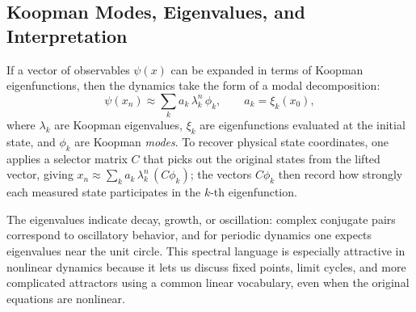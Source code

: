 \documentclass[11pt]{article}
\begin{document}
\subsection{Koopman Modes, Eigenvalues, and Interpretation}
If a vector of observables $\psi(x)$ can be expanded in terms of Koopman eigenfunctions, then the dynamics take the form of a modal decomposition:
\begin{equation}
    \psi(x_n) \approx \sum_{k} a_k \,\lambda_k^n \,\phi_k,
    \qquad a_k = \xi_k(x_0),
    \label{eq:modal-expansion}
\end{equation}
where $\lambda_k$ are Koopman eigenvalues, $\xi_k$ are eigenfunctions evaluated at the initial state, and $\phi_k$ are Koopman \emph{modes}. To recover physical state coordinates, one applies a selector matrix $C$ that picks out the original states from the lifted vector, giving $x_n \approx \sum_k a_k \,\lambda_k^n \,(C \phi_k)$; the vectors $C\phi_k$ then record how strongly each measured state participates in the $k$-th eigenfunction.

The eigenvalues indicate decay, growth, or oscillation: complex conjugate pairs correspond to oscillatory behavior, and for periodic dynamics one expects eigenvalues near the unit circle. This spectral language is especially attractive in nonlinear dynamics because it lets us discuss fixed points, limit cycles, and more complicated attractors using a common linear vocabulary, even when the original equations are nonlinear.
\end{document}
